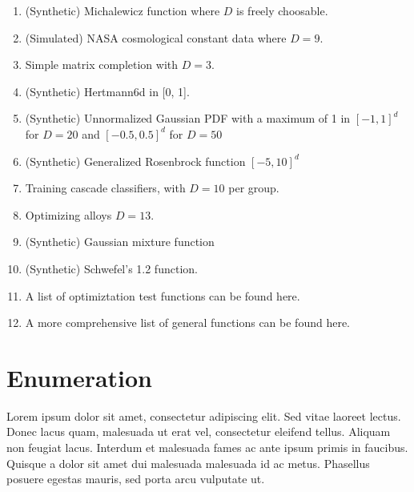 \begin{enumerate}
\item \citep{Gardner2017} (Synthetic) Michalewicz function where $D$ is freely choosable.
\item \citep{Gardner2017} (Simulated) NASA cosmological constant data where $D=9$.
\item \citep{Gardner2017} Simple matrix completion with $D=3$.
\item \citep{Rana2017} (Synthetic) Hertmann6d in [0, 1].
\item \citep{Rana2017} (Synthetic) Unnormalized Gaussian PDF with a maximum of 1 in $[-1, 1]^d$ for $D=20$ and $[-0.5, 0.5]^d$ for $D=50$
\item \citep{Rana2017} (Synthetic) Generalized Rosenbrock function $[-5, 10]^d$
\item \citep{Rana2017} Training cascade classifiers, with $D=10$ per group.
\item \citep{Rana2017} Optimizing alloys $D=13$. 
\item \citep{Li2018} (Synthetic) Gaussian mixture function
\item \citep{Li2018} (Synthetic) Schwefel's 1.2 function.
\item \citep{OptimizationTestFunctions} A list of optimiztation test functions can be found here.
\item \citep{Jamil2013} A more comprehensive list of general functions can be found here.
\end{enumerate}

\section*{Enumeration}
Lorem ipsum dolor sit amet, consectetur adipiscing elit. Sed vitae laoreet lectus. Donec lacus quam, malesuada ut erat vel, consectetur eleifend tellus. Aliquam non feugiat lacus. Interdum et malesuada fames ac ante ipsum primis in faucibus. Quisque a dolor sit amet dui malesuada malesuada id ac metus. Phasellus posuere egestas mauris, sed porta arcu vulputate ut.

